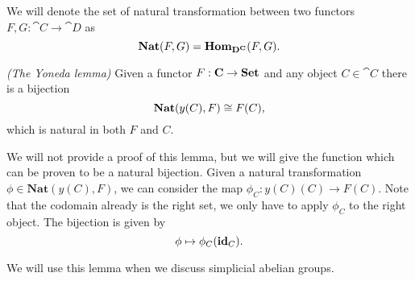 We will denote the set of natural transformation between two functors $F, G: \cat{C} \to \cat{D}$ as
$$ \mathbf{Nat}(F, G) = \mathbf{Hom}_{\mathbf{D}^{\mathbf{C}}}(F, G). $$

\begin{lemma}\emph{(The Yoneda lemma)}
	Given a functor $F: \mathbf{C} \to \mathbf{Set}$ and any object $C \in \cat{C}$ there is a bijection
	$$ \mathbf{Nat}(y(C), F) \cong F(C), $$
	which is natural in both $F$ and $C$.
\end{lemma}

We will not provide a proof of this lemma, but we will give the function which can be proven to be a natural bijection. Given a natural transformation $\phi \in \mathbf{Nat}(y(C), F)$, we can consider the map $\phi_C : y(C)(C) \to F(C)$. Note that the codomain already is the right set, we only have to apply $\phi_C$ to the right object. The bijection is given by
$$ \phi \mapsto \phi_C(\mathbf{id}_C). $$

We will use this lemma when we discuss simplicial abelian groups.